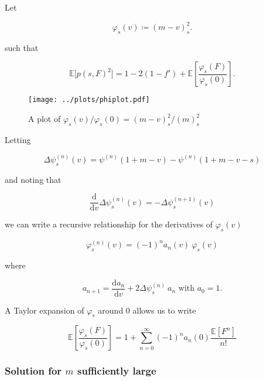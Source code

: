 \documentclass[american, abstract=on]{scrartcl}
\theoremstyle{plain}
\newcommand{\E}{\mathbb{E}}
\begin{document}
Let 

\begin{equation}
    \varphi_s(v) \coloneqq (m - v)^2_s.
\end{equation}

such that

\begin{equation}
    \E\big[ p(s, F)^2 \big] = 1 - 2(1 - f') + \E\left[ \frac{\varphi_s(F)}{\varphi_s(0)} \right].
\end{equation}

\begin{figure}[H]
    \centering
    \texttt{[image: ../plots/phiplot.pdf]} 
    \caption{A plot of $\varphi_s(v) / \varphi_s(0) = (m-v)^2_s / (m)^2_s$}
    \label{fig:phi}    
\end{figure}

Letting

\begin{equation}
    \Delta \psi^{(n)}_s(v) = \psi^{(n)}(1 + m - v) - \psi^{(n)}(1 + m - v - s)
\end{equation}

and noting that

\begin{equation}
    \frac{\text{d}}{\text{d}v} \Delta \psi^{(n)}_s(v) = -\Delta \psi^{(n + 1)}_s(v)
\end{equation}

we can write a recursive relationship for the derivatives of $\varphi_s(v)$

\begin{equation}
    \varphi_s^{(n)}(v) = (-1)^n a_{n}(v) \ \varphi_s(v)
\end{equation}

where

\begin{equation}
    a_{n+1} = \frac{\text{d}a_n}{\text{d}v} + 2 \Delta \psi^{(n)}_s \ a_n \text{ with } a_{0} = 1.
\end{equation}  

A Taylor expansion of $\varphi_s$ around $0$ allows us to write

\begin{equation}
    \E\left[\frac{\varphi_s(F)}{\varphi_s(0)}\right] = 1 + \sum^{\infty}_{n = 0} (-1)^n a_{n}(0) \frac{\E[F^n]}{n!}
\end{equation}
\fi

\subsubsection[Solution for m sufficiently large]{Solution for $m$ sufficiently large}
\end{document}
